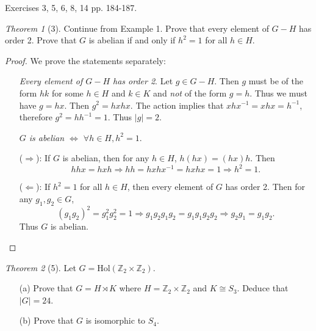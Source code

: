 \documentclass[12pt]{article}
\theoremstyle{remark}
\theoremstyle{named}
\newtheorem*{theorem}{Theorem}
\renewcommand{\implies}{\Rightarrow}
\newcommand{\coimplies}{\Leftarrow}
\begin{document}
Exercises 3, 5, 6, 8, 14 pp. 184-187.

\begin{theorem}[3]
    Continue from Example 1. Prove that every element of \(G - H\) has order 2. Prove that \(G\) is abelian if and only if \(h^2 = 1\) for all \(h \in H\). 
\end{theorem}

\begin{proof}
    We prove the statements separately:
    \begin{enumerate}
        \item[] \textit{Every element of \(G - H\) has order 2}. Let \(g \in G - H\). Then \(g\) must be of the form \(hk\) for some \(h \in H\) and \(k \in K\) and \textit{not} of the form \(g = h\). Thus we must have \(g = hx\). Then \(g^2 = hxhx\). The action implies that \(xhx^{-1} = xhx = h^{-1}\), therefore \(g^2 = hh^{-1} = 1\). Thus \(|g| = 2\).
    
        \item[] \textit{\(G\) is abelian \(\iff\) \(\forall h \in H, h^2 = 1\)}. 
    
        (\(\implies\)): If \(G\) is abelian, then for any \(h \in H\), \(h(hx) = (hx)h\). Then 
        \[hhx = hxh \implies hh = hxhx^{-1} = hxhx = 1 \implies h^2 = 1.\]
    
        (\(\coimplies\)): If \(h^2 = 1\) for all \(h \in H\), then every element of \(G\) has order 2. Then for any \(g_1, g_2 \in G\), 
        \[(g_1g_2)^2 = g_1^2 g_2^2 = 1 \implies g_1 g_2 g_1 g_2 = g_1 g_1 g_2 g_2 \implies g_2 g_1 = g_1 g_2.\]
        Thus \(G\) is abelian.
    \end{enumerate}
\end{proof}

\begin{theorem}[5]
    Let \(G = \text{Hol}(\mathbb Z_2 \times \mathbb Z_2)\).
    \begin{enumerate}
        \item[(a)] Prove that \(G = H \rtimes K\) where \(H = \mathbb Z_2 \times \mathbb Z_2\) and \(K \cong S_3\). Deduce that \(|G| = 24\).
        \item[(b)] Prove that \(G\) is isomorphic to \(S_4\).  
    \end{enumerate}
\end{theorem}
\end{document}
